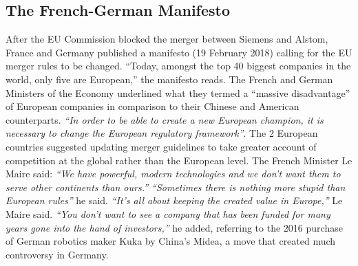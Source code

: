 
\newpage
    \subsection{The French-German Manifesto}

        After the EU Commission blocked the merger between Siemens and Alstom, France and Germany published a manifesto (19 February 2018) calling for the EU merger rules to be changed.  “Today, amongst the top 40 biggest companies in the world, only five are European,” the manifesto reads.  The French and German Ministers of the Economy underlined what they termed a “massive disadvantage” of European companies in comparison to their Chinese and American counterparts. 
        \textit{“In order to be able to create a new European champion, it is necessary to change the European regulatory framework”}. The 2 European countries suggested updating merger guidelines to take greater account of competition at the global rather than the European level. 
        The French Minister Le Maire said: \textit{“We have powerful, modern technologies and we don’t want them to serve other continents than ours.” “Sometimes there is nothing more stupid than European rules” }he said. 
        \textit{“It’s all about keeping the created value in Europe,”} Le Maire said.  \textit{“You don’t want to see a company that has been funded for many years gone into the hand of investors,”} he added, referring to the 2016 purchase of German robotics maker Kuka by China’s Midea, a move that created much controversy in Germany. 

